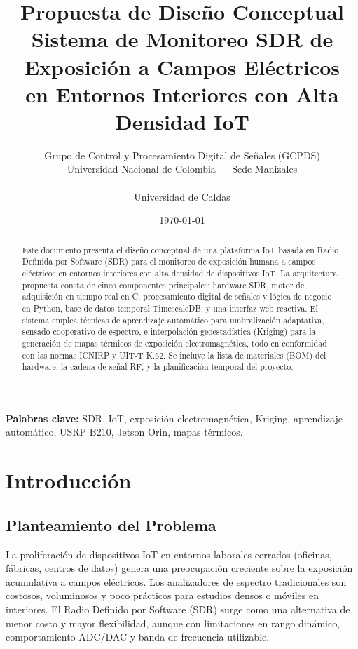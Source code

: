 \documentclass[12pt,a4paper]{article}
\title{
  \vspace{-2cm}
  \textbf{Propuesta de Diseño Conceptual}\\[0.3cm]
  \large Sistema de Monitoreo SDR de Exposición a Campos Eléctricos\\
  en Entornos Interiores con Alta Densidad IoT
}
\author{
  \small
  Grupo de Control y Procesamiento Digital de Señales (GCPDS)\\
  Universidad Nacional de Colombia --- Sede Manizales\\
  \vspace{0.2cm}\\
  Universidad de Caldas
}
\date{\small \today}
\begin{document}
\maketitle
\thispagestyle{empty}

\begin{abstract}
\noindent
Este documento presenta el diseño conceptual de una plataforma IoT basada en Radio Definida por Software (SDR) para el monitoreo de exposición humana a campos eléctricos en entornos interiores con alta densidad de dispositivos IoT. La arquitectura propuesta consta de cinco componentes principales: hardware SDR, motor de adquisición en tiempo real en C, procesamiento digital de señales y lógica de negocio en Python, base de datos temporal TimescaleDB, y una interfaz web reactiva. El sistema emplea técnicas de aprendizaje automático para umbralización adaptativa, sensado cooperativo de espectro, e interpolación geoestadística (Kriging) para la generación de mapas térmicos de exposición electromagnética, todo en conformidad con las normas ICNIRP y UIT-T K.52. Se incluye la lista de materiales (BOM) del hardware, la cadena de señal RF, y la planificación temporal del proyecto.
\end{abstract}

\vspace{1cm}
{\small
\noindent\textbf{Palabras clave:} SDR, IoT, exposición electromagnética, Kriging, aprendizaje automático, USRP B210, Jetson Orin, mapas térmicos.
}

\newpage
\tableofcontents
\newpage

\section{Introducción}

\subsection{Planteamiento del Problema}

La proliferación de dispositivos IoT en entornos laborales cerrados (oficinas, fábricas, centros de datos) genera una preocupación creciente sobre la exposición acumulativa a campos eléctricos. Los analizadores de espectro tradicionales son costosos, voluminosos y poco prácticos para estudios densos o móviles en interiores. El Radio Definido por Software (SDR) surge como una alternativa de menor costo y mayor flexibilidad, aunque con limitaciones en rango dinámico, comportamiento ADC/DAC y banda de frecuencia utilizable.
\end{document}
